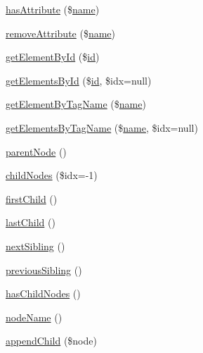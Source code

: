\begin{DoxyCompactItemize}
\item 
\hyperlink{classsimple__html__dom__node_ac78ba27a41d0291c61326022489d4986}{has\+Attribute} (\$\hyperlink{dom__testcase_8php_a7e76f3957f225b9a14d6fab0a55392ce}{name})
\item 
\hyperlink{classsimple__html__dom__node_abbf04707cf678979459a4438e1450876}{remove\+Attribute} (\$\hyperlink{dom__testcase_8php_a7e76f3957f225b9a14d6fab0a55392ce}{name})
\item 
\hyperlink{classsimple__html__dom__node_aec6ca41b9859728595ece521ca638e48}{get\+Element\+By\+Id} (\$\hyperlink{invalid__testcase_8php_af94d69fa7897fa25e80204500b8586eb}{id})
\item 
\hyperlink{classsimple__html__dom__node_a12433180a44804217a6089284c1e337a}{get\+Elements\+By\+Id} (\$\hyperlink{invalid__testcase_8php_af94d69fa7897fa25e80204500b8586eb}{id}, \$idx=null)
\item 
\hyperlink{classsimple__html__dom__node_a73eb6caf89c86044a5ed0092484f375d}{get\+Element\+By\+Tag\+Name} (\$\hyperlink{dom__testcase_8php_a7e76f3957f225b9a14d6fab0a55392ce}{name})
\item 
\hyperlink{classsimple__html__dom__node_a7d6c89e0ea53cd3866bb03eac8ef300d}{get\+Elements\+By\+Tag\+Name} (\$\hyperlink{dom__testcase_8php_a7e76f3957f225b9a14d6fab0a55392ce}{name}, \$idx=null)
\item 
\hyperlink{classsimple__html__dom__node_a38cacd4491f3f41cf275df362bb64c06}{parent\+Node} ()
\item 
\hyperlink{classsimple__html__dom__node_a543b9f022b4d71d19a8f055b3b87bb77}{child\+Nodes} (\$idx=-\/1)
\item 
\hyperlink{classsimple__html__dom__node_a2e7ff3e4db465652634f86004ccb83db}{first\+Child} ()
\item 
\hyperlink{classsimple__html__dom__node_aa290d153aa9b41988d2b4bfb23424241}{last\+Child} ()
\item 
\hyperlink{classsimple__html__dom__node_a6ef403032300227cea0cbd91e4ddccba}{next\+Sibling} ()
\item 
\hyperlink{classsimple__html__dom__node_abd98231235f474bb5a4457715cdbd333}{previous\+Sibling} ()
\item 
\hyperlink{classsimple__html__dom__node_af364b2c56fa29308bdc66b8a6b2b8d3b}{has\+Child\+Nodes} ()
\item 
\hyperlink{classsimple__html__dom__node_afd68aa0cdee9735a7b13891300f4891b}{node\+Name} ()
\item 
\hyperlink{classsimple__html__dom__node_ae1d4fc95e0556bcc5970086f5c24aa3e}{append\+Child} (\$node)
\end{DoxyCompactItemize}

